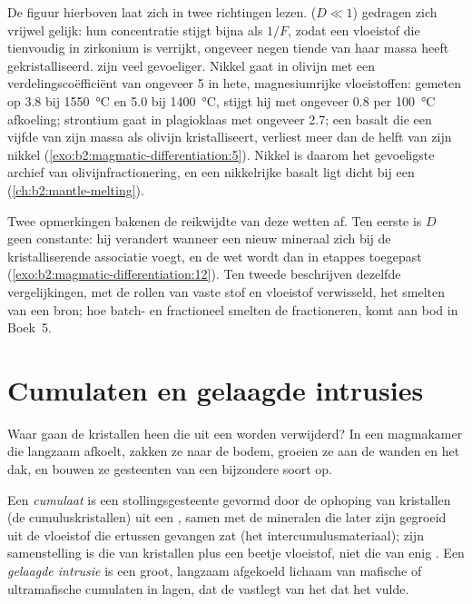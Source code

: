 De figuur hierboven laat zich in twee richtingen lezen.  ($D \ll 1$) gedragen zich
vrijwel gelijk: hun concentratie stijgt bijna als $1/F$, zodat een vloeistof die
tienvoudig in zirkonium is verrijkt, ongeveer negen tiende van haar massa heeft gekristalliseerd.  zijn veel gevoeliger. Nikkel gaat in olivijn met een verdelingscoëfficiënt
van ongeveer 5 in hete, magnesiumrijke vloeistoffen: gemeten op 3.8 bij
\qty{1550}{\celsius} en 5.0 bij \qty{1400}{\celsius}, stijgt hij met ongeveer 0.8 per
\qty{100}{\celsius} afkoeling; strontium gaat in
plagioklaas met ongeveer 2.7; een basalt die een vijfde van zijn massa als
olivijn kristalliseert, verliest meer dan de helft van zijn nikkel (\cref{exo:b2:magmatic-differentiation:5}). Nikkel is daarom het
gevoeligste archief van olivijnfractionering, en een nikkelrijke basalt ligt
dicht bij een  (\cref{ch:b2:mantle-melting}).

Twee opmerkingen bakenen de reikwijdte van deze wetten af. Ten eerste is $D$ geen constante: hij verandert
wanneer een nieuw mineraal zich bij de kristalliserende associatie voegt, en de wet wordt dan
in etappes toegepast (\cref{exo:b2:magmatic-differentiation:12}). Ten tweede beschrijven dezelfde vergelijkingen, met de rollen van vaste stof en
vloeistof verwisseld, het smelten van een bron; hoe batch- en fractioneel
smelten de  fractioneren, komt aan bod in Boek~5.

\section{Cumulaten en gelaagde intrusies}\label{sec:b2:magmatic-differentiation:cumulates}

Waar gaan de kristallen heen die uit een  worden verwijderd? In een magmakamer die
langzaam afkoelt, zakken ze naar de bodem, groeien ze aan de wanden en het dak, en bouwen ze gesteenten van
een bijzondere soort op.

\begin{definition}\label{def:b2:magmatic-differentiation:cumulate}
Een \emph{cumulaat} is een stollingsgesteente gevormd door de ophoping van
kristallen (de cumuluskristallen) uit een , samen met de mineralen die later zijn gegroeid
uit de vloeistof die ertussen gevangen zat (het intercumulusmateriaal); zijn samenstelling
is die van kristallen plus een beetje vloeistof, niet die van enig . Een
\emph{gelaagde intrusie} is een groot, langzaam afgekoeld lichaam van mafische of
ultramafische cumulaten in lagen, dat de  vastlegt van
het  dat het vulde.
\end{definition}

